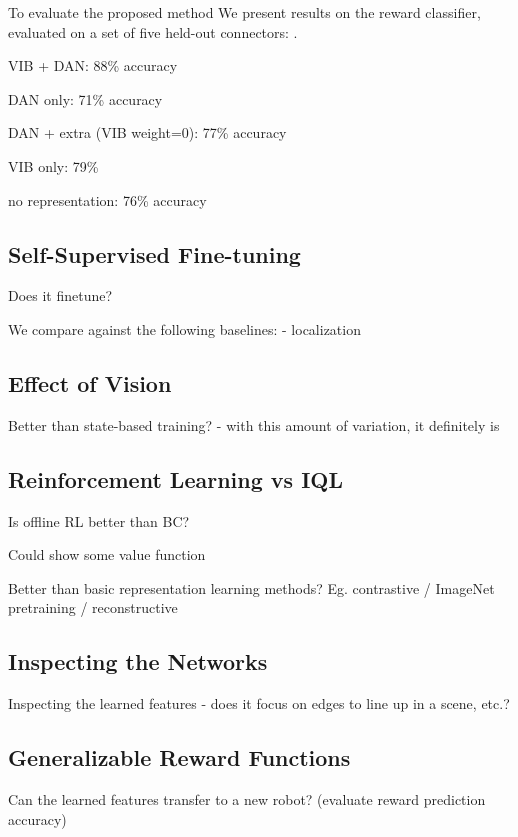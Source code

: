 \documentclass[letterpaper, 10 pt, conference, final]{ieeeconf}   %
\begin{document}
To evaluate the proposed method 
We present results on the reward classifier, evaluated on a set of five held-out connectors: .

VIB + DAN: 88\% accuracy 

DAN only: 71\% accuracy

DAN + extra (VIB weight=0): 77\% accuracy

VIB only: 79\%

no representation: 76\% accuracy

\subsection{Self-Supervised Fine-tuning}

Does it finetune?

We compare against the following baselines:
- localization

\subsection{Effect of Vision}

Better than state-based training? - with this amount of variation, it definitely is

\subsection{Reinforcement Learning vs IQL}

Is offline RL better than BC?

Could show some value function

Better than basic representation learning methods? Eg. contrastive / ImageNet pretraining / reconstructive

\subsection{Inspecting the Networks}

Inspecting the learned features - does it focus on edges to line up in a scene, etc.?

\subsection{Generalizable Reward Functions}

Can the learned features transfer to a new robot? (evaluate reward prediction accuracy)
\end{document}
